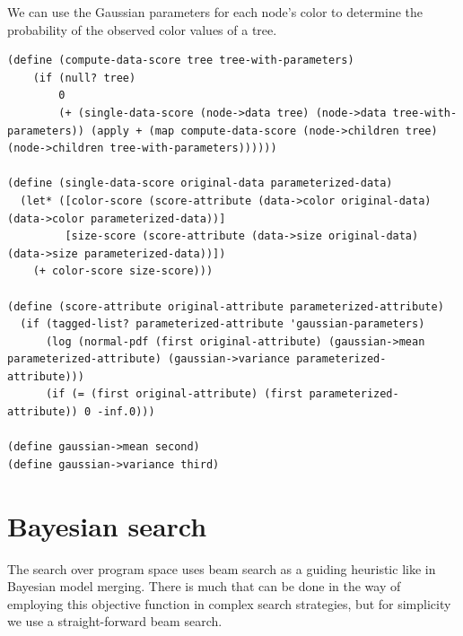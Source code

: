 \documentclass[a4paper,10pt]{article}
\begin{document}
We can use the Gaussian parameters for each node's color to determine the probability of the observed color values of a tree.
\begin{lstlisting}[frame=trBL]
(define (compute-data-score tree tree-with-parameters)
    (if (null? tree)
        0
        (+ (single-data-score (node->data tree) (node->data tree-with-parameters)) (apply + (map compute-data-score (node->children tree) (node->children tree-with-parameters))))))

(define (single-data-score original-data parameterized-data)
  (let* ([color-score (score-attribute (data->color original-data) (data->color parameterized-data))]
         [size-score (score-attribute (data->size original-data) (data->size parameterized-data))])
    (+ color-score size-score)))

(define (score-attribute original-attribute parameterized-attribute)
  (if (tagged-list? parameterized-attribute 'gaussian-parameters)
      (log (normal-pdf (first original-attribute) (gaussian->mean parameterized-attribute) (gaussian->variance parameterized-attribute)))
      (if (= (first original-attribute) (first parameterized-attribute)) 0 -inf.0)))

(define gaussian->mean second)
(define gaussian->variance third)
\end{lstlisting}


\newpage
\section{Bayesian search}
The search over program space uses beam search as a guiding heuristic like in Bayesian model merging.  There is much that can be done in the way of employing this objective function in complex search strategies, but for simplicity we use a straight-forward beam search.  
\end{document}
